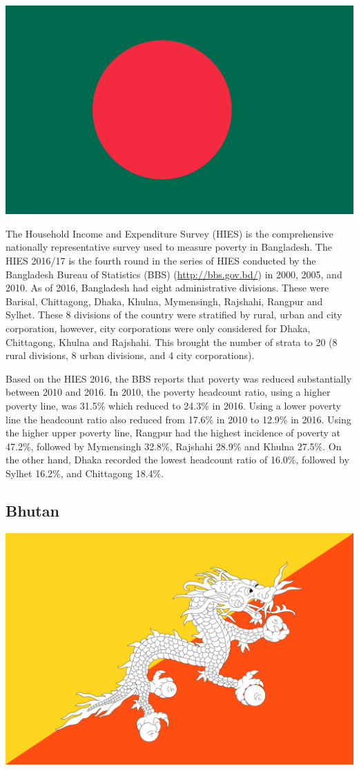 \documentclass[13 pt,]{book}
\begin{document}
\begin{flushleft}\includegraphics[width=0.4\linewidth]{figures/Flag_of_Bangladesh} \end{flushleft}

The Household Income and Expenditure Survey (HIES) is the comprehensive
nationally representative survey used to measure poverty in Bangladesh.
The HIES 2016/17 is the fourth round in the series of HIES conducted by
the Bangladesh Bureau of Statistics (BBS) (\url{http://bbs.gov.bd/}) in
2000, 2005, and 2010. As of 2016, Bangladesh had eight administrative
divisions. These were Barisal, Chittagong, Dhaka, Khulna, Mymensingh,
Rajshahi, Rangpur and Sylhet. These 8 divisions of the country were
stratified by rural, urban and city corporation, however, city
corporations were only considered for Dhaka, Chittagong, Khulna and
Rajshahi. This brought the number of strata to 20 (8 rural divisions, 8
urban divisions, and 4 city corporations).

Based on the HIES 2016, the BBS reports that poverty was reduced
substantially between 2010 and 2016. In 2010, the poverty headcount
ratio, using a higher poverty line, was 31.5\% which reduced to 24.3\%
in 2016. Using a lower poverty line the headcount ratio also reduced
from 17.6\% in 2010 to 12.9\% in 2016. Using the higher upper poverty
line, Rangpur had the highest incidence of poverty at 47.2\%, followed
by Mymensingh 32.8\%, Rajshahi 28.9\% and Khulna 27.5\%. On the other
hand, Dhaka recorded the lowest headcount ratio of 16.0\%, followed by
Sylhet 16.2\%, and Chittagong 18.4\%.

\subsection{Bhutan}\label{bhutan}

\begin{flushleft}\includegraphics[width=0.4\linewidth]{figures/Flag_of_Bhutan} \end{flushleft}
\end{document}
